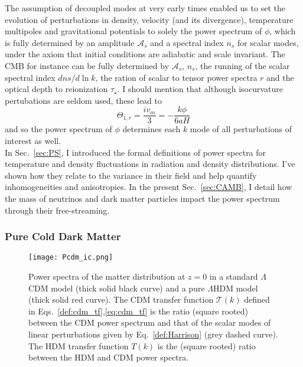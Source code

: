 The assumption of decoupled modes at very early times enabled us to set the evolution of perturbations in density, velocity (and its divergence), temperature multipoles and gravitational potentials to solely the power spectrum of $\phi$, which is fully determined by an amplitude $\mathcal{A}_s$ and a spectral index $n_s$ for scalar modes, under the axiom that initial conditions are adiabatic and scale invariant. The CMB for instance can be fully determined by $\mathcal{A}_s$, $n_s$, the running of the scalar spectral index $d ns / d \ln k$, the ration of scalar to tensor power spectra $r$ and the optical depth to reionization $\tau_{\star}$. I should mention that although isocurvature pertubations are seldom used, these lead to 
\begin{equation}
\Theta_{1, r} = \frac{i v_m}{3} = - \frac{k \phi}{6 a H}
\end{equation} and so the power spectrum of $\phi$ determines each $k$ mode of all perturbations of interest as well.\\

In Sec.~\ref{sec:PS}, I introduced the formal definitions of power spectra for temperature and density fluctuations in radiation and density distributions. I've shown how they relate to the variance in their field and help quantify inhomogeneities and anisotropies. In the present Sec.~\ref{sec:CAMB}, I detail how the mass of neutrinos and dark matter particles impact the power spectrum through their free-streaming. 


\subsubsection{Pure Cold Dark Matter}


\begin{figure}
\begin{center}
\texttt{[image: Pcdm\_ic.png]}
\caption{Power spectra of the matter distribution at $z=0$ in a standard $\Lambda$CDM model (thick solid black curve) and a pure $\Lambda$HDM model (thick solid red curve). The CDM transfer function $\mathcal{T}(k)$ defined in Eqs.~\ref{def:cdm_tf},\ref{eq:cdm_tf} is the ratio (square rooted) between the CDM power spectrum and that of the scalar modes of linear perturbations given by Eq.~\ref{def:Harrison} (grey dashed curve). The HDM transfer function $T(k)$ is the (square rooted) ratio between the HDM and CDM power spectra.}
\label{fig:initialpwrspc}
\end{center}
\end{figure}

